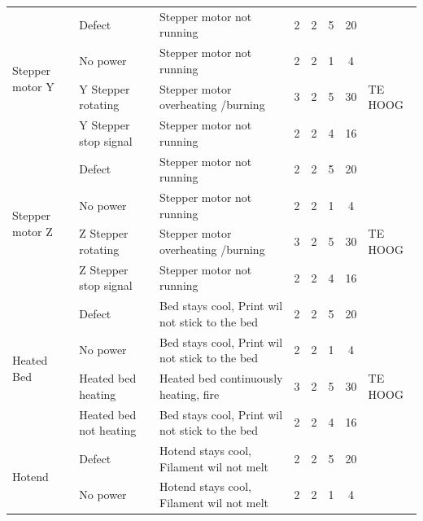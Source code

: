 \documentclass{article}
\begin{document}
\begin{landscape}
\begin{longtable}{|l|l|l|c|c|c|c|l|}
        \multirow{4}{*}{Stepper motor Y}    & Defect                & Stepper motor not running             & 2 & 2 & 5 & 20 & \\
                                            & No power              & Stepper motor not running             & 2 & 2 & 1 &  4 & \\
                                            & Y Stepper rotating    & Stepper motor overheating /burning    & 3 & 2 & 5 & 30 & TE HOOG \\
                                            & Y Stepper stop signal & Stepper motor not running             & 2 & 2 & 4 & 16 & \\ 
                                            \hline
        \multirow{4}{*}{Stepper motor Z}    & Defect                & Stepper motor not running             & 2 & 2 & 5 & 20 & \\
                                            & No power              & Stepper motor not running             & 2 & 2 & 1 &  4 & \\
                                            & Z Stepper rotating    & Stepper motor overheating /burning    & 3 & 2 & 5 & 30 & TE HOOG \\
                                            & Z Stepper stop signal & Stepper motor not running             & 2 & 2 & 4 & 16 & \\ 
                                            \hline 
        \multirow{4}{*}{Heated Bed}         & Defect                    & Bed stays cool, Print wil not stick to the bed    & 2 & 2 & 5 & 20 & \\
                                            & No power                  & Bed stays cool, Print wil not stick to the bed    & 2 & 2 & 1 &  4 & \\
                                            & Heated bed heating        & Heated bed continuously heating, fire             & 3 & 2 & 5 & 30 & TE HOOG \\
                                            & Heated bed not heating    & Bed stays cool, Print wil not stick to the bed    & 2 & 2 & 4 & 16 & \\ 
                                            \hline 
        \multirow{4}{*}{Hotend}             & Defect                    & Hotend stays cool, Filament wil not melt          & 2 & 2 & 5 & 20 & \\
                                            & No power                  & Hotend stays cool, Filament wil not melt          & 2 & 2 & 1 &  4 & \\

\end{longtable}
\end{landscape}
\end{document}
